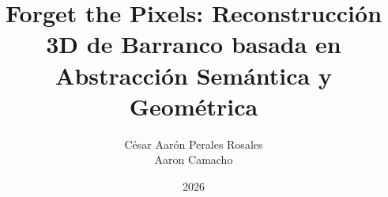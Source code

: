 \documentclass[a4paper,12pt,oneside]{tesisutec}
\begin{document}
\frontmatter


\title{Forget the Pixels: Reconstrucción 3D de Barranco basada en Abstracción Semántica y Geométrica}

\author{
  César Aarón Perales Rosales\\[0.2cm]
  Aaron Camacho
}

\date{2026}

\maketitle




\newpage
\tableofcontents
\newpage
\listoftables
\newpage
\listoffigures


\mainmatter
\pagestyle{fancy}







\nocite{*}
\printbibliography[title={\hfill\Large\bf{REFERENCIAS BIBLIOGRÁFICAS}\hfill}] 

\appendix
\end{document}
